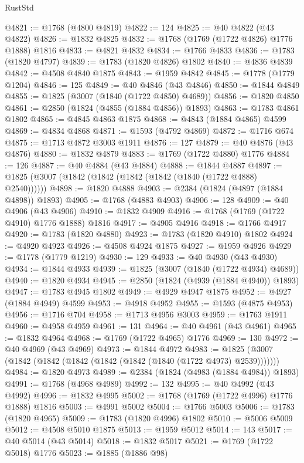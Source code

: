 \begin{lexlean}{RustStd}
\begin{coremodule}
@4821 := @1768 (@4800 @4819)
@4822 := 124
@4825 := @40 @4822 (@43 @4822)
@4826 := @1832 @4825
@4832 := @1768 (@1769 (@1722 @4826) @1776 @1888) @1816
@4833 := @4821 @4832
@4834 := @1766 @4833
@4836 := @1783 (@1820 @4797)
@4839 := @1783 (@1820 @4826) @1802
@4840 := @4836 @4839
@4842 := @4508 @4840 @1875
@4843 := @1959 @4842
@4845 := @1778 (@1779 @1204)
@4846 := 125
@4849 := @40 @4846 (@43 @4846)
@4850 := @1844 @4849
@4855 := @1825 (@3007 (@1840 (@1722 @4850) @4689))
@4856 := @1820 @4850
@4861 := @2850 (@1824 (@4855 (@1884 @4856)) @1893)
@4863 := @1783 @4861 @1802
@4865 := @4845 @4863 @1875
@4868 := @4843 (@1884 @4865) @4599
@4869 := @4834 @4868
@4871 := @1593 (@4792 @4869)
@4872 := @1716 @674
@4875 := @1713 @4872 @3003 @1911
@4876 := 127
@4879 := @40 @4876 (@43 @4876)
@4880 := @1832 @4879
@4883 := @1769 (@1722 @4880) @1776
@4884 := 126
@4887 := @40 @4884 (@43 @4884)
@4888 := @1844 @4887
@4897 := @1825 (@3007 (@1842 (@1842 (@1842 (@1842 (@1840 (@1722 @4888) @2540))))))
@4898 := @1820 @4888
@4903 := @2384 (@1824 (@4897 (@1884 @4898)) @1893)
@4905 := @1768 (@4883 @4903)
@4906 := 128
@4909 := @40 @4906 (@43 @4906)
@4910 := @1832 @4909
@4916 := @1768 (@1769 (@1722 @4910) @1776 @1888) @1816
@4917 := @4905 @4916
@4918 := @1766 @4917
@4920 := @1783 (@1820 @4880)
@4923 := @1783 (@1820 @4910) @1802
@4924 := @4920 @4923
@4926 := @4508 @4924 @1875
@4927 := @1959 @4926
@4929 := @1778 (@1779 @1219)
@4930 := 129
@4933 := @40 @4930 (@43 @4930)
@4934 := @1844 @4933
@4939 := @1825 (@3007 (@1840 (@1722 @4934) @4689))
@4940 := @1820 @4934
@4945 := @2850 (@1824 (@4939 (@1884 @4940)) @1893)
@4947 := @1783 @4945 @1802
@4949 := @4929 @4947 @1875
@4952 := @4927 (@1884 @4949) @4599
@4953 := @4918 @4952
@4955 := @1593 (@4875 @4953)
@4956 := @1716 @704
@4958 := @1713 @4956 @3003
@4959 := @1763 @1911
@4960 := @4958 @4959
@4961 := 131
@4964 := @40 @4961 (@43 @4961)
@4965 := @1832 @4964
@4968 := @1769 (@1722 @4965) @1776
@4969 := 130
@4972 := @40 @4969 (@43 @4969)
@4973 := @1844 @4972
@4983 := @1825 (@3007 (@1842 (@1842 (@1842 (@1842 (@1842 (@1840 (@1722 @4973) @2539)))))))
@4984 := @1820 @4973
@4989 := @2384 (@1824 (@4983 (@1884 @4984)) @1893)
@4991 := @1768 (@4968 @4989)
@4992 := 132
@4995 := @40 @4992 (@43 @4992)
@4996 := @1832 @4995
@5002 := @1768 (@1769 (@1722 @4996) @1776 @1888) @1816
@5003 := @4991 @5002
@5004 := @1766 @5003
@5006 := @1783 (@1820 @4965)
@5009 := @1783 (@1820 @4996) @1802
@5010 := @5006 @5009
@5012 := @4508 @5010 @1875
@5013 := @1959 @5012
@5014 := 143
@5017 := @40 @5014 (@43 @5014)
@5018 := @1832 @5017
@5021 := @1769 (@1722 @5018) @1776
@5023 := @1885 (@1886 @98)

\end{coremodule}
\end{lexlean}
